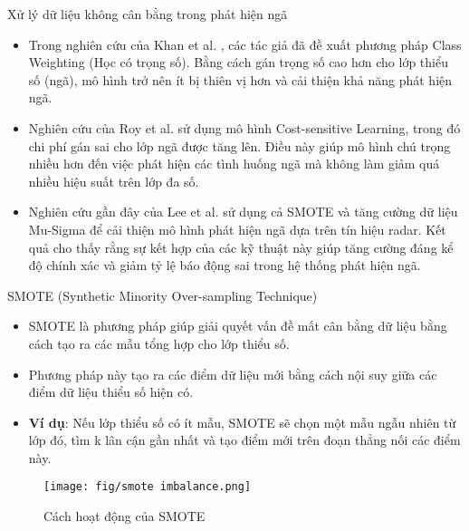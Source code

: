 \documentclass{beamer}
\begin{document}
\begin{frame}{Xử lý dữ liệu không cân bằng trong phát hiện ngã}

\begin{itemize}
   
    \item Trong nghiên cứu của Khan et al. \cite{khan2017costsensitive}, các tác giả đã đề xuất phương pháp Class Weighting (Học có trọng số). Bằng cách gán trọng số cao hơn cho lớp thiểu số (ngã), mô hình trở nên ít bị thiên vị hơn và cải thiện khả năng phát hiện ngã.

    \item Nghiên cứu của Roy et al. \cite{roy2020improvingfall} sử dụng mô hình Cost-sensitive Learning, trong đó chi phí gán sai cho lớp ngã được tăng lên. Điều này giúp mô hình chú trọng nhiều hơn đến việc phát hiện các tình huống ngã mà không làm giảm quá nhiều hiệu suất trên lớp đa số.
    
    \item Nghiên cứu gần đây của Lee et al. \cite{lee2023radarimbalanced} sử dụng cả SMOTE và tăng cường dữ liệu Mu-Sigma để cải thiện mô hình phát hiện ngã dựa trên tín hiệu radar. Kết quả cho thấy rằng sự kết hợp của các kỹ thuật này giúp tăng cường đáng kể độ chính xác và giảm tỷ lệ báo động sai trong hệ thống phát hiện ngã.
\end{itemize}

\end{frame}


\begin{frame}{SMOTE (Synthetic Minority Over-sampling Technique)}
    \begin{itemize}
        \item SMOTE là phương pháp giúp giải quyết vấn đề mất cân bằng dữ liệu bằng cách tạo ra các mẫu tổng hợp cho lớp thiểu số.
        \item Phương pháp này tạo ra các điểm dữ liệu mới bằng cách nội suy giữa các điểm dữ liệu thiểu số hiện có.
        \item \textbf{Ví dụ}: Nếu lớp thiểu số có ít mẫu, SMOTE sẽ chọn một mẫu ngẫu nhiên từ lớp đó, tìm k lân cận gần nhất và tạo điểm mới trên đoạn thẳng nối các điểm này.
    \end{itemize}
    \begin{figure}
        \centering
        \texttt{[image: fig/smote imbalance.png]}
        \caption{Cách hoạt động của SMOTE}
        \label{fig:lstm}
    \end{figure}
\end{frame}
\end{document}
